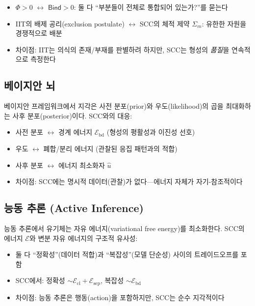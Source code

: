 \begin{itemize}
    \item $\Phi > 0$ $\leftrightarrow$ $\mathsf{Bind} > 0$: 둘 다 ``부분들이 전체로 통합되어 있는가?''를 묻는다
    \item IIT의 배제 공리(exclusion postulate) $\leftrightarrow$ SCC의 체적 제약 $\Sigma_m$: 유한한 자원을 경쟁적으로 배분
    \item 차이점: IIT는 의식의 존재/부재를 판별하려 하지만, SCC는 형성의 \emph{품질}을 연속적으로 측정한다
\end{itemize}

\subsection{베이지안 뇌}

베이지안 프레임워크에서 지각은 사전 분포(prior)와 우도(likelihood)의 곱을 최대화하는 사후 분포(posterior)이다. SCC와의 대응:

\begin{itemize}
    \item 사전 분포 $\leftrightarrow$ 경계 에너지 $\mathcal{E}_{\mathrm{bd}}$ (형성의 평활성과 이진성 선호)
    \item 우도 $\leftrightarrow$ 폐합/분리 에너지 (관찰된 응집 패턴과의 적합)
    \item 사후 분포 $\leftrightarrow$ 에너지 최소화자 $\hat{u}$
    \item 차이점: SCC에는 명시적 데이터(관찰)가 없다---에너지 자체가 자기-참조적이다
\end{itemize}

\subsection{능동 추론 (Active Inference)}

능동 추론에서 유기체는 자유 에너지(variational free energy)를 최소화한다. SCC의 에너지 $\mathcal{E}$와 변분 자유 에너지의 구조적 유사성:

\begin{itemize}
    \item 둘 다 ``정확성''(데이터 적합)과 ``복잡성''(모델 단순성) 사이의 트레이드오프를 포함
    \item SCC에서: 정확성 $\sim \mathcal{E}_{\mathrm{cl}} + \mathcal{E}_{\mathrm{sep}}$, 복잡성 $\sim \mathcal{E}_{\mathrm{bd}}$
    \item 차이점: 능동 추론은 행동(action)을 포함하지만, SCC는 순수 지각적이다
\end{itemize}

